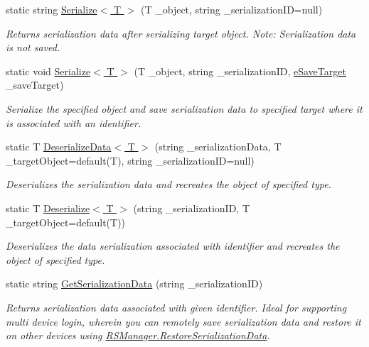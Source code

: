 \begin{DoxyCompactItemize}
\item 
static string \hyperlink{class_voxel_busters_1_1_runtime_serialization_1_1_r_s_manager_ab6530217efdcb8d99bf7d3044f2b8561}{Serialize$<$ T $>$} (T \+\_\+object, string \+\_\+serialization\+I\+D=null)
\begin{DoxyCompactList}\small\item\em Returns serialization data after serializing target object. Note\+: Serialization data is not saved. \end{DoxyCompactList}\item 
static void \hyperlink{class_voxel_busters_1_1_runtime_serialization_1_1_r_s_manager_a49a845ef8799d3cb183a51011e5aee88}{Serialize$<$ T $>$} (T \+\_\+object, string \+\_\+serialization\+I\+D, \hyperlink{namespace_voxel_busters_1_1_runtime_serialization_aacaa3008b2cb441fbe4708df854019bf}{e\+Save\+Target} \+\_\+save\+Target)
\begin{DoxyCompactList}\small\item\em Serialize the specified object and save serialization data to specified target where it is associated with an identifier. \end{DoxyCompactList}\item 
static T \hyperlink{class_voxel_busters_1_1_runtime_serialization_1_1_r_s_manager_a862f53c7275407d42b1c1e282cdc7d48}{Deserialize\+Data$<$ T $>$} (string \+\_\+serialization\+Data, T \+\_\+target\+Object=default(T), string \+\_\+serialization\+I\+D=null)
\begin{DoxyCompactList}\small\item\em Deserializes the serialization data and recreates the object of specified type. \end{DoxyCompactList}\item 
static T \hyperlink{class_voxel_busters_1_1_runtime_serialization_1_1_r_s_manager_a38aa7a063cb3ac84eed6f198d5654fdb}{Deserialize$<$ T $>$} (string \+\_\+serialization\+I\+D, T \+\_\+target\+Object=default(T))
\begin{DoxyCompactList}\small\item\em Deserializes the data serialization associated with identifier and recreates the object of specified type. \end{DoxyCompactList}\item 
static string \hyperlink{class_voxel_busters_1_1_runtime_serialization_1_1_r_s_manager_a75d7bd13b5eb98362397280ef2744862}{Get\+Serialization\+Data} (string \+\_\+serialization\+I\+D)
\begin{DoxyCompactList}\small\item\em Returns serialization data associated with given identifier. Ideal for supporting multi device login, wherein you can remotely save serialization data and restore it on other devices using \hyperlink{class_voxel_busters_1_1_runtime_serialization_1_1_r_s_manager_a9c0963c7dad73a4331c53ec8937c889c}{R\+S\+Manager.\+Restore\+Serialization\+Data}. \end{DoxyCompactList}\item 

\end{DoxyCompactItemize}
